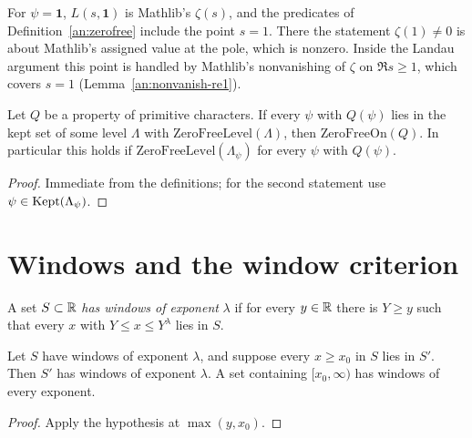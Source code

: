 \begin{remark}[the point $s=1$]\label{an:rem-junk}
For $\psi=\mathbf 1$, $L(s,\mathbf 1)$ is Mathlib's $\zeta(s)$, and the
predicates of Definition~\ref{an:zerofree} include the point $s=1$. There
the statement $\zeta(1)\ne0$ is about Mathlib's assigned value at the pole,
which is nonzero. Inside the Landau argument this point is handled by
Mathlib's nonvanishing of $\zeta$ on $\Re s\ge1$, which covers $s=1$
(Lemma~\ref{an:nonvanish-re1}).
\end{remark}

\begin{lemma}\label{an:zerofree-levels}
Let $Q$ be a property of primitive characters. If every $\psi$ with
$Q(\psi)$ lies in the kept set of some level $\Lambda$ with
$\mathrm{ZeroFreeLevel}(\Lambda)$, then $\mathrm{ZeroFreeOn}(Q)$. In
particular this holds if $\mathrm{ZeroFreeLevel}(\Lambda_{\psi})$ for every
$\psi$ with $Q(\psi)$.
\end{lemma}
\begin{proof}
Immediate from the definitions; for the second statement use
$\psi\in\operatorname{Kept}(\Lambda_{\psi})$.
\end{proof}

\section{Windows and the window criterion}

\begin{definition}[Windows]\label{an:windows}
A set $S\subset\mathbb{R}$ \emph{has windows of exponent} $\lambda$ if for every
$y\in\mathbb{R}$ there is $Y\ge y$ such that every $x$ with $Y\le x\le Y^{\lambda}$
lies in $S$.
\end{definition}

\begin{lemma}\label{an:windows-mono}
Let $S$ have windows of exponent $\lambda$, and suppose every $x\ge x_0$
in $S$ lies in $S'$. Then $S'$ has windows of exponent $\lambda$. A set
containing $[x_0,\infty)$ has windows of every exponent.
\end{lemma}
\begin{proof}
Apply the hypothesis at $\max(y,x_0)$.
\end{proof}

